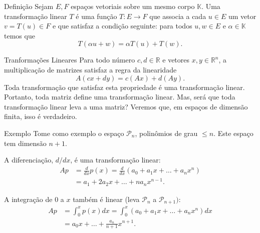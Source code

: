 \documentclass{beamer}
\begin{document}
\begin{darkframes}
\begin{frame}{}
  \begin{block}{Definição}
    Sejam $E,F$ espaços vetoriais sobre um mesmo corpo ${\mathbb{K}}$. Uma transformação linear $T$ é uma função $T:E\to F$ que associa a cada $u\in E$ um vetor $v=T(u) \in F$ e que satisfaz a condição seguinte: para todos $u,w\in E$ e $\alpha \in {\mathbb{K}}$ temos que
    \begin{equation*}
      T(\alpha u+w) = \alpha T(u)+T(w).
    \end{equation*}
  \end{block}
\end{frame}

\begin{frame}{Tranformações Lineares}
  Para todo número $c,d\in {\mathbb{R}}$ e vetores $x,y\in {\mathbb{R}}^n$, a multiplicação de matrizes satisfaz a regra da linearidade
  \begin{equation*}
    A(cx+dy)=c(Ax)+d(Ay).
  \end{equation*}
  Toda transformação que satisfaz esta propriedade é uma transformação linear. Portanto, toda matriz define uma transformação linear. Mas, será que toda transformação linear leva a uma matriz? Veremos que, em espaços de dimensão finita, isso é verdadeiro.
\end{frame}

\begin{frame}{Exemplo}
 Tome como exemplo o espaço ${\mathcal{P}}_n$, polinômios de grau $\leq n$. Este espaço tem dimensão $n+1$.

 A diferenciação, $d/dx$, é uma transformação linear:
 \begin{align*}
   Ap &= \frac{d}{dx} p(x) = \frac{d}{dx} (a_0+a_1x+\ldots+a_nx^n)\\
      & = a_1+2a_2x+\ldots+na_nx^{n-1}.
 \end{align*}

 A integração de $0$ a $x$ também é linear (leva ${\mathcal{P}}_n$ a ${\mathcal{P}}_{n+1})$:
 \begin{align*}
   Ap &= \int_0^x p(x) dx = \int_0^x (a_0+a_1x+\ldots+a_nx^n) dx \\
      &= a_0x + \ldots + \frac{a_n}{n+1} x^{n+1}.
 \end{align*}
\end{frame}



\end{darkframes}
\end{document}
